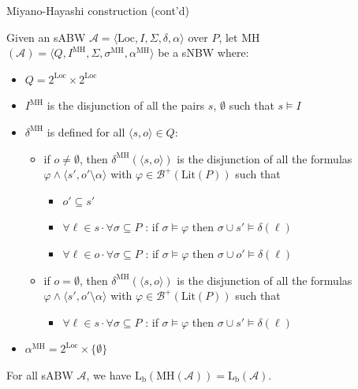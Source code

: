 \documentclass[12pt]{beamer}
\begin{document}
\begin{frame}{Miyano-Hayashi construction (cont'd)}
	
		Given an sABW $\mathcal{A} = \langle \text{Loc}, I, \Sigma, \delta, \alpha \rangle$ over $P$, let MH$(\mathcal{A}) = \langle Q, I^{\text{MH}}, \Sigma, \sigma^{\text{MH}}, \alpha^{\text{MH}} \rangle$ be a sNBW where:
		\begin{itemize}
			\item $Q = 2^{\text{Loc}} \times 2^{\text{Loc}}$
			\item $I^{\text{MH}}$ is the disjunction of all the pairs $s$, $\emptyset$ such that $s \models I$
		
		\item $\delta^{\text{MH}}$ is defined for all $\langle s, o \rangle \in Q$:
		\begin{itemize}
			\item if $o \neq \emptyset$, then $\delta^{\text{MH}}(\langle s, o \rangle)$ is the disjunction of all the formulas $\varphi \land \langle s', o' \setminus \alpha \rangle$ with $\varphi \in \mathcal{B}^{+}(\text{Lit}(P))$ such that
			\begin{itemize}
				\item $o' \subseteq s'$
				\item $\forall \ell \in s \cdot \forall \sigma \subseteq P$ : if $\sigma \models \varphi$ then $\sigma \cup s' \models \delta(\ell)$
				\item $\forall \ell \in o \cdot \forall \sigma \subseteq P$ : if $\sigma \models \varphi$ then $\sigma \cup o' \models \delta(\ell)$
			\end{itemize}
			
			\item if $o = \emptyset$, then $\delta^{\text{MH}}(\langle s, o \rangle)$ is the disjunction of all the formulas $\varphi \land \langle s', o' \setminus \alpha \rangle$ with $\varphi \in \mathcal{B}^{+}(\text{Lit}(P))$ such that
			\begin{itemize}
				\item $\forall \ell \in s \cdot \forall \sigma \subseteq P$ : if $\sigma \models \varphi$ then $\sigma \cup s' \models \delta(\ell)$
			\end{itemize}
		\end{itemize}
		\item $\alpha^{\text{MH}} = 2^{\text{Loc}} \times \{\emptyset\}$
		\end{itemize}
	\begin{theorem}
		For all sABW $\mathcal{A}$, we have $\text{L}_{\text{b}}(\text{MH}(\mathcal{A})) = \text{L}_{\text{b}}(\mathcal{A})$.
	\end{theorem}
\end{frame}
\end{document}
